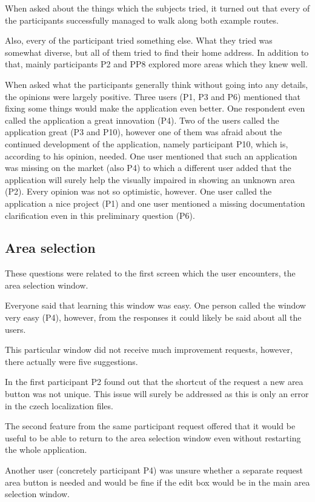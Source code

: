 \documentclass[nolof,digital]{fithesis3}
\begin{document}
When asked about the things which the subjects tried, it turned out that every of the participants successfully managed to walk along both example routes.

Also, every of the participant tried something else. What they tried was somewhat diverse, but all of them tried to find their home address. In addition to that, mainly participants P2 and PP8 explored more areas which they knew well.

When asked what the participants generally think without going into any details, the opinions were largely positive. Three users (P1, P3 and P6) mentioned that fixing some things would make the application even better. One respondent even called the application a great innovation (P4). Two of the users called the application great (P3 and P10), however one of them was afraid about the continued development of the application, namely participant P10,  which is, according to his opinion, needed. One user mentioned that such an application was missing on the market (also P4) to which a different user added that the application will surely help the visually impaired in showing an unknown area (P2). Every opinion was not so optimistic, however. One user called the application a nice project (P1) and one user mentioned a missing documentation clarification even in this preliminary question (P6).
\subsection{Area selection}
These questions were related to the first screen which the user encounters, the area selection window.

Everyone said that learning this window was easy. One person called the window very easy (P4), however, from the responses it could likely be said about all the users.

This particular window did not receive much improvement requests, however, there actually were five suggestions.

In the first participant P2 found out that the shortcut of the request a new area button was not unique. This issue will surely be addressed as this is only an error in the czech localization files.

The second feature from the same participant request offered that it would be useful to be able to return to the area selection window even without restarting the whole application.

Another user (concretely participant P4) was unsure whether a separate request area button is needed and would be fine if the edit box would be in the main area selection window.
\end{document}
